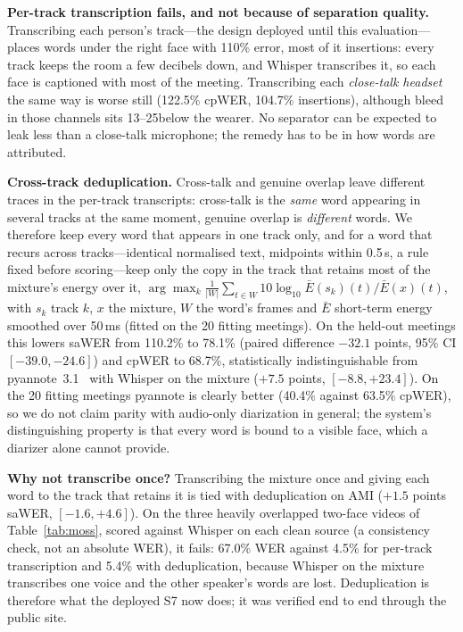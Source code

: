 \begin{table}[t]
\centering
\caption{Captions on the 10 held-out AMI-AV meetings: pooled WER (\%) with 95\% bootstrap intervals over meetings; Ins.\ = insertions. $^\dagger$plain WER, no speakers. $^\ddagger$equal-level close-talk headsets.}
\label{tab:captions}
\footnotesize
\setlength{\tabcolsep}{2pt}

\end{table}

\textbf{Per-track transcription fails, and not because of separation quality.} Transcribing each person's track---the design deployed until this evaluation---places words under the right face with 110\% error, most of it insertions: every track keeps the room a few decibels down, and Whisper transcribes it, so each face is captioned with most of the meeting. Transcribing each \emph{close-talk headset} the same way is worse still (122.5\% cpWER, 104.7\% insertions), although bleed in those channels sits 13--25\dB below the wearer. No separator can be expected to leak less than a close-talk microphone; the remedy has to be in how words are attributed.

\textbf{Cross-track deduplication.} Cross-talk and genuine overlap leave different traces in the per-track transcripts: cross-talk is the \emph{same} word appearing in several tracks at the same moment, genuine overlap is \emph{different} words. We therefore keep every word that appears in one track only, and for a word that recurs across tracks---identical normalised text, midpoints within 0.5\,s, a rule fixed before scoring---keep only the copy in the track that retains most of the mixture's energy over it, $\arg\max_k \frac{1}{|W|}\sum_{t\in W} 10\log_{10}\bar{E}(s_k)(t)/\bar{E}(x)(t)$, with $s_k$ track $k$, $x$ the mixture, $W$ the word's frames and $\bar{E}$ short-term energy smoothed over 50\,ms (fitted on the 20 fitting meetings). On the held-out meetings this lowers saWER from 110.2\% to 78.1\% (paired difference $-32.1$ points, 95\% CI $[-39.0, -24.6]$) and cpWER to 68.7\%, statistically indistinguishable from pyannote~3.1~\cite{bredin2020pyannote,plaquet2023powerset} with Whisper on the mixture ($+7.5$ points, $[-8.8, +23.4]$). On the 20 fitting meetings pyannote is clearly better (40.4\% against 63.5\% cpWER), so we do not claim parity with audio-only diarization in general; the system's distinguishing property is that every word is bound to a visible face, which a diarizer alone cannot provide.

\textbf{Why not transcribe once?} Transcribing the mixture once and giving each word to the track that retains it is tied with deduplication on AMI ($+1.5$ points saWER, $[-1.6, +4.6]$). On the three heavily overlapped two-face videos of Table~\ref{tab:moss}, scored against Whisper on each clean source (a consistency check, not an absolute WER), it fails: 67.0\% WER against 4.5\% for per-track transcription and 5.4\% with deduplication, because Whisper on the mixture transcribes one voice and the other speaker's words are lost. Deduplication is therefore what the deployed S7 now does; it was verified end to end through the public site.

